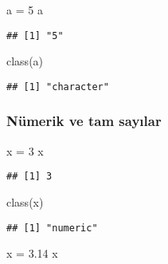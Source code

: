 \documentclass[
]{book}
\newenvironment{Shaded}{\begin{snugshade}}{\end{snugshade}}
\newcommand{\DecValTok}[1]{\textcolor[rgb]{0.00,0.00,0.81}{#1}}
\newcommand{\FloatTok}[1]{\textcolor[rgb]{0.00,0.00,0.81}{#1}}
\newcommand{\FunctionTok}[1]{\textcolor[rgb]{0.00,0.00,0.00}{#1}}
\newcommand{\NormalTok}[1]{#1}
\newcommand{\OtherTok}[1]{\textcolor[rgb]{0.56,0.35,0.01}{#1}}
\newcommand{\StringTok}[1]{\textcolor[rgb]{0.31,0.60,0.02}{#1}}
\begin{document}
\begin{Shaded}
\begin{Highlighting}[]
\NormalTok{a }\OtherTok{=} \StringTok{\textquotesingle{}5\textquotesingle{}}
\NormalTok{a}
\end{Highlighting}
\end{Shaded}

\begin{verbatim}
## [1] "5"
\end{verbatim}

\begin{Shaded}
\begin{Highlighting}[]
\FunctionTok{class}\NormalTok{(a)}
\end{Highlighting}
\end{Shaded}

\begin{verbatim}
## [1] "character"
\end{verbatim}

\hypertarget{nuxfcmerik-ve-tam-sayux131lar}{%
\subsubsection{Nümerik ve tam sayılar}\label{nuxfcmerik-ve-tam-sayux131lar}}

\begin{Shaded}
\begin{Highlighting}[]
\NormalTok{x }\OtherTok{=} \DecValTok{3} 
\NormalTok{x}
\end{Highlighting}
\end{Shaded}

\begin{verbatim}
## [1] 3
\end{verbatim}

\begin{Shaded}
\begin{Highlighting}[]
\FunctionTok{class}\NormalTok{(x)}
\end{Highlighting}
\end{Shaded}

\begin{verbatim}
## [1] "numeric"
\end{verbatim}

\begin{Shaded}
\begin{Highlighting}[]
\NormalTok{x }\OtherTok{=} \FloatTok{3.14}
\NormalTok{x}
\end{Highlighting}
\end{Shaded}
\end{document}
